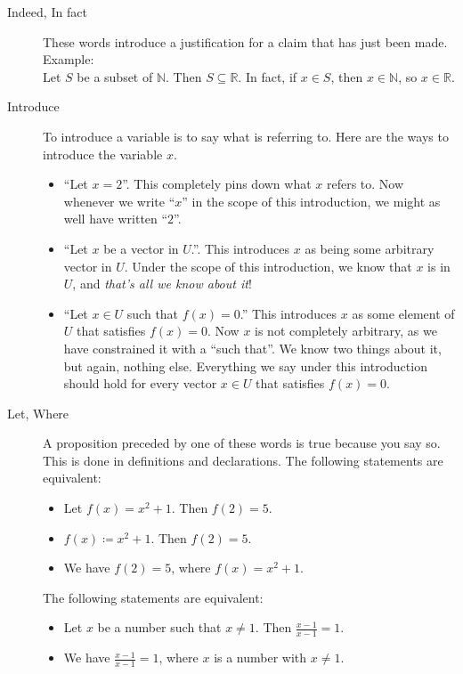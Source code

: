 \documentclass[12pt]{article}
\begin{document}
\begin{description}
  \item[Indeed, In fact] These words introduce a justification for a
    claim that has just been made.  Example:\\

    Let $S$ be a subset of $\mathbb{N}$.  Then $S\subseteq
    \mathbb{R}$.  In fact, if $x\in S$, then $x\in\mathbb{N}$, so
    $x\in\mathbb{R}$.

  \item[Introduce] To introduce a variable is to say what is referring
    to.  Here are the ways to introduce the variable $x$.
    \begin{itemize}
    \item ``Let $x=2$''.  This completely pins down what $x$ refers to.
      Now whenever we write ``$x$'' in the scope of this introduction,
      we might as well have written ``$2$''.
    \item ``Let $x$ be a vector in $U$.''.  This introduces $x$ as
      being some arbitrary vector in $U$.  Under the scope of this
      introduction, we know that $x$ is in $U$, and \textit{that's all
        we know about it}!
    \item ``Let $x\in U$ such that $f(x)=0$.''  This introduces $x$ as
      some element of $U$ that satisfies $f(x)=0$.  Now $x$ is not
      completely arbitrary, as we have constrained it with a ``such
      that''.  We know two things about it, but again, nothing else.
      Everything we say under this introduction should hold for every
      vector $x\in U$ that satisfies $f(x)=0$.
    \end{itemize}
    
    
  \item[Let, Where] A proposition preceded by one of these words is
    true because you say so.  This is done in definitions and
    declarations.  The following statements are equivalent:
    \begin{itemize}
    \item Let $f(x)=x^2+1$.  Then $f(2)=5$. 
    \item $f(x)\coloneqq x^2+1$.  Then $f(2)=5$. 
    \item We have $f(2)=5$, where $f(x)=x^2+1$. 
    \end{itemize}
    The following statements are equivalent:
    \begin{itemize}
      \item Let $x$ be a number such that $x\neq 1$.  Then
        $\frac{x-1}{x-1}=1$.
      \item We have $\frac{x-1}{x-1}=1$, where $x$ is a number with
        $x\neq 1$.
    \end{itemize}


\end{description}
\end{document}
